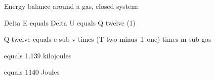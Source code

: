 Energy balance around a gas, closed system:

Delta E equals Delta U equals Q twelve (1)

Q twelve equals c sub v times (T two minus T one) times m sub gas

equals 1.139 kilojoules

equals 1140 Joules